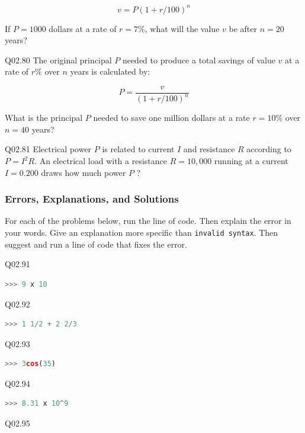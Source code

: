 \documentclass{book}
\newenvironment{problems}{}{}  %
\begin{document}
\begin{problems}
\[ v = P(1 + r/100)^n \]

If \(P=1000\) dollars at a rate of \(r=7\%\), what will the value \(v\)
be after \(n=20\) years?

Q02.80 The original principal \(P\) needed to produce a total savings of
value \(v\) at a rate of \(r\%\) over \(n\) years is calculated by:

\[ P = \frac{v}{(1+r/100)^n} \]

What is the principal \(P\) needed to save one million dollars at a rate
\(r=10\%\) over \(n=40\) years?

Q02.81 Electrical power \(P\) is related to current \(I\) and resistance
\(R\) according to \(P = I^2R\). An electrical load with a resistance
\(R = 10,000\) running at a current \(I=0.200\) draws how much power
\(P\) ?
        \end{problems}

    




    
        \subsubsection{Errors, Explanations, and
Solutions}\label{errors-explanations-and-solutions}

For each of the problems below, run the line of code. Then explain the
error in your words. Give an explanation more specific than
\lstinline!invalid syntax!. Then suggest and run a line of code that
fixes the error.

Q02.91

\begin{lstlisting}[language=Python]
>>> 9 x 10
\end{lstlisting}

Q02.92

\begin{lstlisting}[language=Python]
>>> 1 1/2 + 2 2/3
\end{lstlisting}

Q02.93

\begin{lstlisting}[language=Python]
>>> 3cos(35)
\end{lstlisting}

Q02.94

\begin{lstlisting}[language=Python]
>>> 8.31 x 10^9
\end{lstlisting}

Q02.95
\end{document}
